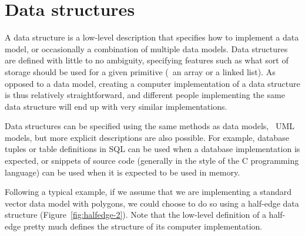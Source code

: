 \section{Data structures}

A data structure is a low-level description that specifies how to implement a data model, or occasionally a combination of multiple data models.
Data structures are defined with little to no ambiguity, specifying features such as what sort of storage should be used for a given primitive (\eg\ an array or a linked list). 
As opposed to a data model, creating a computer implementation of a data structure is thus relatively straightforward, and different people implementing the same data structure will end up with very similar implementations.

Data structures can be specified using the same methods as data models, \eg\ UML models, but more explicit descriptions are also possible.
For example, database tuples or table definitions in SQL can be used when a database implementation is expected, or snippets of source code  (generally in the style of the C programming language) can be used when it is expected to be used in memory.

Following a typical example, if we assume that we are implementing a standard vector data model with polygons, we could choose to do so using a half-edge data structure (Figure~\ref{fig:halfedge-2}).
Note that the low-level definition of a half-edge pretty much defines the structure of its computer implementation.

